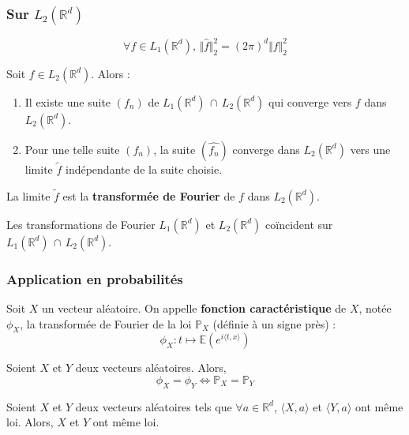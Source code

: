   \subsubsection{Sur \texorpdfstring{$L_2(\mathbb{R}^d)$}{Rᵈ}}

  \begin{theorem}
    \[ \forall f \in L_1(\mathbb{R}^d), \, \Vert \widehat{f} \Vert^2_2 = (2 \pi)^d \Vert f \Vert^2_2 \]
  \end{theorem}

  \begin{theorem}
    Soit $f \in L_2(\mathbb{R}^d)$. Alors :
    \begin{enumerate}[label=(\roman*)]
      \item Il existe une suite $(f_n)$ de $L_1(\mathbb{R}^d) \, \cap \, L_2(\mathbb{R}^d)$ qui converge vers $f$ dans $L_2(\mathbb{R}^d)$.
      \item Pour une telle suite $(f_n)$, la suite $(\widehat{f_n})$ converge dans $L_2(\mathbb{R}^d)$ vers une limite $\widetilde{f}$ indépendante de la suite choisie.
    \end{enumerate}
  \end{theorem}

  \begin{definition}
    La limite $\widetilde{f}$ est la \textbf{transformée de Fourier} de $f$ dans $L_2(\mathbb{R}^d)$.
  \end{definition}

  \begin{proposition}
    Les transformations de Fourier $L_1(\mathbb{R}^d)$ et $L_2(\mathbb{R}^d)$ coïncident sur $L_1(\mathbb{R}^d) \, \cap \, L_2(\mathbb{R}^d)$.
  \end{proposition}

  \subsubsection{Application en probabilités}


  \begin{definition}
    Soit $X$ un vecteur aléatoire. On appelle \textbf{fonction caractéristique} de $X$, notée $\phi_X$, la transformée de Fourier de la loi $\mathbb{P}_X$ (définie à un signe près) :
    \[ \phi_X : t \mapsto \mathbb{E}(e^{i \langle t, x \rangle}) \]
  \end{definition}

  \begin{theorem}
    Soient $X$ et $Y$ deux vecteurs aléatoires. Alors,
    \[ \phi_X = \phi_Y \iff \mathbb{P}_X = \mathbb{P}_Y \]
  \end{theorem}

  \begin{corollary}
    Soient $X$ et $Y$ deux vecteurs aléatoires tels que $\forall a \in \mathbb{R}^d$, $\langle X, a \rangle$ et $\langle Y, a \rangle$ ont même loi. Alors, $X$ et $Y$ ont même loi.
  \end{corollary}

